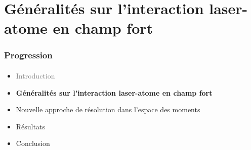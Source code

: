 \section{G\'en\'eralit\'es sur l'interaction laser-atome en champ fort}

\begin{frame}
 \frametitle{Progression}
 \framesubtitle{}
 \begin{itemize}
   \item \textcolor{gray}{Introduction}
   \item \textbf{G\'en\'eralit\'es sur l'interaction laser-atome
en champ fort}
   \item Nouvelle approche de r\'esolution
dans l'espace des moments
   \item R\'esultats
   \item Conclusion
 \end{itemize}
\end{frame}

